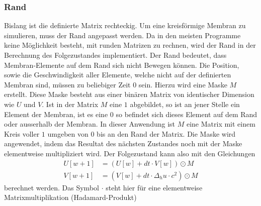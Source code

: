\subsubsection{Rand}
Bislang ist die definierte Matrix rechteckig.
Um eine kreisförmige Membran zu simulieren, muss der Rand angepasst werden.
Da in den meisten Programme keine Möglichkeit besteht, mit runden Matrizen zu rechnen, wird der Rand in der Berechnung des Folgezustandes implementiert.
Der Rand bedeutet, dass Membran-Elemente auf dem Rand sich nicht Bewegen können.
Die Position, sowie die Geschwindigkeit aller Elemente, welche nicht auf der definierten Membran sind, müssen zu beliebiger Zeit $0$ sein.
Hierzu wird eine Maske $M$ erstellt. 
Diese Maske besteht aus einer binären Matrix von identischer Dimension wie $ U $ und $ V $. 
Ist in der Matrix $M$ eine $1$ abgebildet, so ist an jener Stelle ein Element der Membran, ist es eine $0$ so befindet sich dieses Element auf dem Rand oder ausserhalb der Membran.
In dieser Anwendung ist $M$ eine Matrix mit einem Kreis voller $1$ umgeben von $0$ bis an den Rand der Matrix.
Die Maske wird angewendet, indem das Resultat des nächsten Zustandes noch mit der Maske elementweise multipliziert wird. 
Der Folgezustand kann also mit den Gleichungen
\begin{align}
	\label{kreismembran:eq:folge_U} 
	U[w+1] &= (U[w] + dt \cdot V[w])\odot M\\
	\label{kreismembran:eq:folge_V}
	V[w+1] &= (V[w] + dt \cdot \Delta_h u \cdot c^2)\odot M
\end{align}
berechnet werden. Das Symbol $\cdot$ steht hier für eine elementweise Matrixmultiplikation (Hadamard-Produkt)
